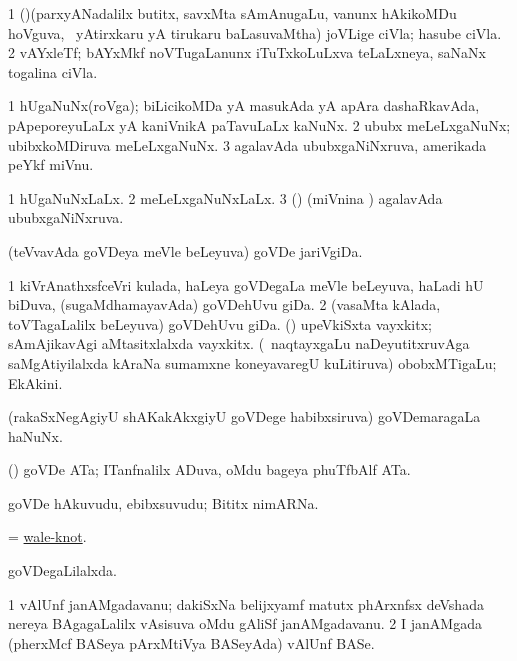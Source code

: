 \bentry
{} 
\gl{\nA}
\bmng
\bnum
\num{1} (\pArxparx)(parxyANadalilx butitx, savxMta sAmAnugaLu, \mo vanunx hAkikoMDu hoVguva, \kanmu\ yAtirxkaru yA tirukaru baLasuvaMtha) joVLige ciVla; hasube ciVla. 
\num{2} vAYxleTf; bAYxMkf noVTugaLanunx iTuTxkoLuLxva teLaLxneya, saNaNx togalina ciVla. 
\enum
\emng
\eentry

\bentry
{} 
\gl{\nA}
\bmng
\bnum
\num{1} hUgaNuNx(roVga); biLicikoMDa yA masukAda yA apAra dashaRkavAda, pApeporeyuLaLx yA kaniVnikA paTavuLaLx kaNuNx. 
\num{2} ububx meLeLxgaNuNx; ubibxkoMDiruva meLeLxgaNuNx.
\num{3} agalavAda ububxgaNiNxruva, amerikada peYkf miVnu. 
\enum
\emng
\eentry

\bentry
{} 
\gl{\gu}
\expl{}
\bmng
\bnum
\num{1} hUgaNuNxLaLx. 
\num{2} meLeLxgaNuNxLaLx. 
\num{3} (\ame) (miVnina \vi) agalavAda ububxgaNiNxruva. 
\enum
\emng
\eentry

\bentry
{} 
\gl{\nA}
\expl{}
\bmng
(teVvavAda goVDeya meVle beLeyuva) goVDe jariVgiDa. 
\emng
\eentry

\bentry
{} 
\gl{\nA}
\expl{}
\bmng
\bnum
\num{1} kiVrAnathxsfceVri kulada, haLeya goVDegaLa meVle beLeyuva, haLadi hU biDuva, (sugaMdhamayavAda) goVDehUvu giDa. 
\num{2} (vasaMta kAlada, toVTagaLalilx beLeyuva) goVDehUvu giDa. 
 (\AmA) 
\banum
{} upeVkiSxta vayxkitx; sAmAjikavAgi aMtasitxlalxda vayxkitx. 
 (\kanmu\ naqtayxgaLu naDeyutitxruvAga saMgAtiyilalxda kAraNa sumamxne koneyavaregU kuLitiruva) obobxMTigaLu; EkAkini. 
\eanum
\numie
\enum
\emng
\eentry

\bentry
{} 
\gl{\nA}
\expl{}
\bmng
(rakaSxNegAgiyU shAKakAkxgiyU goVDege habibxsiruva) goVDemaragaLa haNuNx. 
\emng
\eentry

\bentry
{} 
\gl{\nA}
\expl{}
\bmng
(\birx) goVDe ATa; ITanfnalilx ADuva, oMdu bageya phuTfbAlf ATa. 
\emng
\eentry

\bentry
{} 
\gl{\nA}
\bmng
goVDe hAkuvudu, ebibxsuvudu; Bititx nimARNa. 
\emng
\eentry

\bentry
{} 
\gl{\nA}
\expl{}
\bmng
= \hyperlink{wale-knot}{wale-knot}. 
\emng
\eentry

\bentry
{} 
\gl{\gu}
\expl{}
\bmng
goVDegaLilalxda. 
\emng
\eentry

\bentry
{}  
\gl{\nA}
\expl{}
\bmng
\bnum
\num{1} vAlUnf janAMgadavanu; dakiSxNa belijxyamf matutx phArxnfsx deVshada nereya BAgagaLalilx vAsisuva oMdu gAliSf janAMgadavanu. 
\num{2} I janAMgada (pherxMcf BASeya pArxMtiVya BASeyAda) vAlUnf BASe. 
\enum
\emng
\eentry

